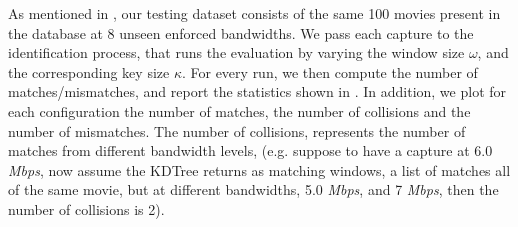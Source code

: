As mentioned in , our testing dataset consists of the same
100 movies present in the database at 8 unseen enforced bandwidths. We pass
each capture to the identification process, that runs the evaluation by varying
the window size $\omega$, and the corresponding key size $\kappa$. For every
run, we then compute the number of matches/mismatches, and report the
statistics shown in . In addition, we plot for each
configuration the number of matches, the number of collisions and the number of
mismatches. The number of collisions, represents the number of matches from
different bandwidth levels, (e.g. suppose to have a capture at 6.0 \emph{Mbps},
now assume the KDTree returns as matching windows, a list of matches all of the
same movie, but at different bandwidths, 5.0 \emph{Mbps}, and 7 \emph{Mbps},
then the number of collisions is 2).

